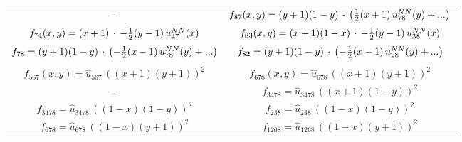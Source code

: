 \documentclass[12pt]{article}
\begin{document}
\begin{tabular}{c|c}
		$-$ 
		&
		$f_{87}(x,y)= (y+1)(1-y) \, \cdot \, \left(\frac{1}{2}(x+1) \,u^{\tiny NN}_{78}(y)+...\right)$ 
		\\
		$f_{74}(x,y)= (x+1) \, \cdot \, -\frac{1}{2}(y-1)\,u^{\tiny NN}_{47}(x)$ 
		&
		$f_{83}(x,y)= (x+1)(1-x) \, \cdot \, -\frac{1}{2}(y-1)\,u^{\tiny NN}_{38}(x)$ 
		\\
		$f_{78}= (y+1)(1-y) \, \cdot \, \left(-\frac{1}{2}(x-1)\,u^{\tiny NN}_{78}(y) + ...\right)$ 
		&
		$f_{82}= (y+1)(1-y) \, \cdot \, \left(-\frac{1}{2}(x-1)\,u^{\tiny NN}_{28}(y)+...\right)$ 
		\\ [0.75ex]
		\hline 
		\\ [-0.75ex]
		$f_{567}(x,y)=\hat{u}_{567}\,((x+1)(y+1))^2$ 
		&
		$f_{678}(x,y)=\hat{u}_{678}\,((x+1)(y+1))^2$
		\\
		$-$ 
		&
		$f_{3478} = \hat{u}_{3478}\,((x+1)(1-y))^2$
		\\
		$f_{3478} = \hat{u}_{3478}\,((1-x)(1-y))^2$ 
		&
		$f_{238} = \hat{u}_{238}\,((1-x)(1-y))^2$
		\\
		$f_{678} = \hat{u}_{678}\,((1-x)(y+1))^2$ 
		&
		$f_{1268} = \hat{u}_{1268}\,((1-x)(y+1))^2$
		\\
		\hline
		\hline
	\end{tabular}
\end{document}
